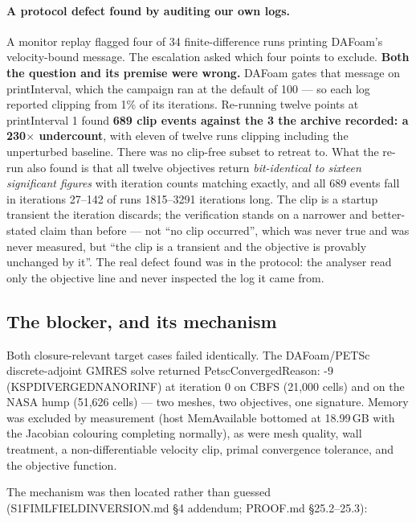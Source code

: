 \documentclass[11pt,a4paper]{article}
\newcommand{\breakus}{\textunderscore\allowbreak}
\newcommand{\code}[1]{{\small\ttfamily\let\_\breakus #1}}
\newcommand{\artifact}[1]{{\footnotesize\ttfamily\let\_\breakus #1}}
\begin{document}
\paragraph{A protocol defect found by auditing our own logs.} A monitor replay flagged four
of 34 finite-difference runs printing DAFoam's velocity-bound message. The escalation asked
which four points to exclude. \textbf{Both the question and its premise were wrong.} DAFoam
gates that message on \code{printInterval}, which the campaign ran at the default of 100 ---
so each log reported clipping from 1\% of its iterations. Re-running twelve points at
\code{printInterval 1} found \textbf{689 clip events against the 3 the archive recorded: a
230$\times$ undercount}, with eleven of twelve runs clipping including the unperturbed
baseline. There was no clip-free subset to retreat to. What the re-run also found is that
all twelve objectives return \emph{bit-identical to sixteen significant figures} with
iteration counts matching exactly, and all 689 events fall in iterations 27--142 of runs
1815--3291 iterations long. The clip is a startup transient the iteration discards; the
verification stands on a narrower and better-stated claim than before --- not ``no clip
occurred'', which was never true and was never measured, but ``the clip is a transient and
the objective is provably unchanged by it''. The real defect found was in the protocol: the
analyser read only the objective line and never inspected the log it came from.

\subsection{The blocker, and its mechanism}

Both closure-relevant target cases failed identically. The DAFoam/PETSc discrete-adjoint
GMRES solve returned \code{PetscConvergedReason: -9} (\code{KSP\_DIVERGED\_NANORINF}) at
iteration 0 on CBFS (21{,}000 cells) and on the NASA hump (51{,}626 cells) --- two meshes,
two objectives, one signature. Memory was excluded by measurement (host \code{MemAvailable}
bottomed at 18.99\,GB with the Jacobian colouring completing normally), as were mesh
quality, wall treatment, a non-differentiable velocity clip, primal convergence tolerance,
and the objective function.

The mechanism was then located rather than guessed
(\artifact{S1\_FIML\_FIELD\_INVERSION.md} \S4 addendum; \code{PROOF.md} \S25.2--25.3):
\end{document}

